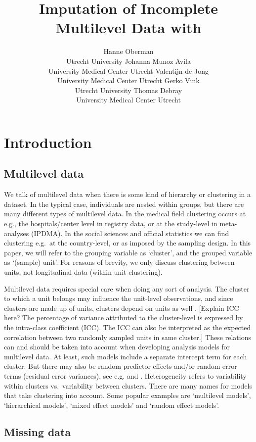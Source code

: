 \documentclass[
]{jss}
\author{
Hanne Oberman\\Utrecht University \And Johanna Munoz Avila\\University
Medical Center Utrecht \AND Valentijn de Jong\\University Medical
Center Utrecht \And Gerko Vink\\Utrecht University \AND Thomas
Debray\\University Medical Center Utrecht
}
\title{Imputation of Incomplete Multilevel Data with \pkg{mice}}
\begin{document}
\hypertarget{introduction}{%
\section{Introduction}\label{introduction}}

\hypertarget{multilevel-data}{%
\subsection{Multilevel data}\label{multilevel-data}}

We talk of multilevel data when there is some kind of hierarchy or
clustering in a dataset. In the typical case, individuals are nested
within groups, but there are many different types of multilevel data. In
the medical field clustering occurs at e.g., the hospitals/center level
in registry data, or at the study-level in meta-analyses (IPDMA). In the
social sciences and official statistics we can find clustering e.g.~at
the country-level, or as imposed by the sampling design. In this paper,
we will refer to the grouping variable as `cluster', and the grouped
variable as `(sample) unit'. For reasons of brevity, we only discuss
clustering between units, not longitudinal data (within-unit
clustering).

Multilevel data requires special care when doing any sort of analysis.
The cluster to which a unit belongs may influence the unit-level
observations, and since clusters are made up of units, clusters depend
on units as well \citep{hox17}. {[}Explain ICC here? The percentage of
variance attributed to the cluster-level is expressed by the intra-class
coefficient (ICC). The ICC can also be interpreted as the expected
correlation between two randomly sampled units in same cluster.{]} These
relations can and should be taken into account when developing analysis
models for multilevel data. At least, such models include a separate
intercept term for each cluster. But there may also be random predictor
effects and/or random error terms (residual error variances), see e.g.
\citet{hox17} and \citet{jong21}. Heterogeneity refers to variability
within clusters vs.~variability between clusters. There are many names
for models that take clustering into account. Some popular examples are
`multilevel models', `hierarchical models', `mixed effect models' and
`random effect models'.

\hypertarget{missing-data}{%
\subsection{Missing data}\label{missing-data}}
\end{document}
